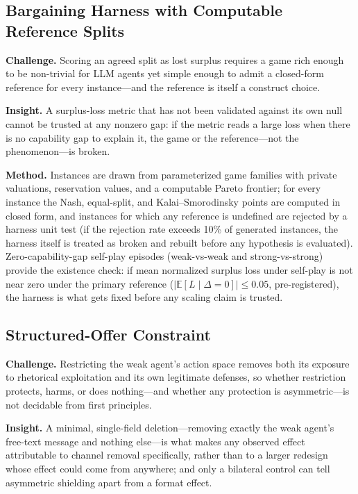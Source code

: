 \documentclass[conference]{IEEEtran}
\begin{document}
\subsection{Bargaining Harness with Computable Reference Splits}

\textbf{Challenge.} Scoring an agreed split as lost surplus requires a game rich enough to be non-trivial for LLM agents yet simple enough to admit a closed-form reference for every instance---and the reference is itself a construct choice.

\textbf{Insight.} A surplus-loss metric that has not been validated against its own null cannot be trusted at any nonzero gap: if the metric reads a large loss when there is no capability gap to explain it, the game or the reference---not the phenomenon---is broken.

\textbf{Method.} Instances are drawn from parameterized game families with private valuations, reservation values, and a computable Pareto frontier; for every instance the Nash, equal-split, and Kalai--Smorodinsky points are computed in closed form, and instances for which any reference is undefined are rejected by a harness unit test (if the rejection rate exceeds 10\% of generated instances, the harness itself is treated as broken and rebuilt before any hypothesis is evaluated). Zero-capability-gap self-play episodes (weak-vs-weak and strong-vs-strong) provide the existence check: if mean normalized surplus loss under self-play is not near zero under the primary reference ($|\mathbb{E}[L \mid \Delta{=}0]| \leq 0.05$, pre-registered), the harness is what gets fixed before any scaling claim is trusted.

\subsection{Structured-Offer Constraint}

\textbf{Challenge.} Restricting the weak agent's action space removes both its exposure to rhetorical exploitation and its own legitimate defenses, so whether restriction protects, harms, or does nothing---and whether any protection is asymmetric---is not decidable from first principles.

\textbf{Insight.} A minimal, single-field deletion---removing exactly the weak agent's free-text message and nothing else---is what makes any observed effect attributable to channel removal specifically, rather than to a larger redesign whose effect could come from anywhere; and only a bilateral control can tell asymmetric shielding apart from a format effect.
\end{document}
